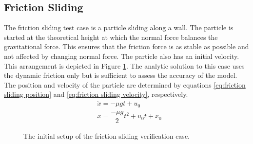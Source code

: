 \documentclass[10pt,a4paper,titlepage]{report}
\begin{document}
\subsection{Friction Sliding}
\label{sec:friction sliding verification}
The friction sliding test case is a particle sliding along a wall. The particle is started at the theoretical height at which the normal force balances the gravitational force. This ensures that the friction force is as stable as possible and not affected by changing normal force. The particle also has an initial velocity. This arrangement is depicted in Figure \ref{fig:friction sliding}.
The analytic solution to this case uses the dynamic friction only but is sufficient to assess the accuracy of the model. The position and velocity of the particle are determined by equations \ref{eq:friction sliding position} and \ref{eq:friction sliding velocity}, respectively.
\begin{align}
&\dot{x} = - \mu g t + u_0 \label{eq:friction sliding velocity} \\
&x = \dfrac{- \mu g}{2}t^2 + u_0 t + x_0 \label{eq:friction sliding position}
\end{align}
\begin{figure}[!ht]
\centering

\caption{The initial setup of the friction sliding verification case.}
\label{fig:friction sliding}
\end{figure}
\end{document}
